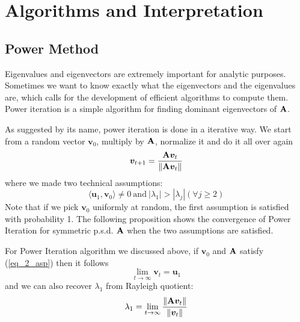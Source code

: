 \documentclass[../book-template.tex]{subfiles}
\begin{document}
\section{Algorithms and Interpretation}
\subsection{Power Method}
Eigenvalues and eigenvectors are extremely important for analytic purposes. Sometimes we want to know exactly what the eigenvectors and the eigenvalues are, which calls for the development of efficient algorithms to compute them. Power iteration is a simple algorithm for finding dominant eigenvectors of ${\bf A}$.
\par As suggested by its name, power iteration is done in a iterative way. We start from a random vector $\bm{v}_0$, multiply by ${\bf A}$, normalize it and do it all over again
\begin{equation*}
    \bm{v}_{t+1} = \frac{{\bf A}\bm{v}_t}{\|{\bf A}\bm{v}_t\|}
\end{equation*}
where we made two technical assumptions:
\begin{equation}\label{eq_2_asp}
    \langle \bm{u}_1,\bm{v}_0\rangle\neq 0\ \text{and}\ |\lambda_1|>|\lambda_j|(\forall j\geq2)
\end{equation}
Note that if we pick $\bm{v}_0$ uniformly at random, the first assumption is satisfied with probability 1. The following proposition shows the convergence of Power Iteration for symmetric p.s.d. ${\bf A}$ when the two assumptions are satisfied.
\begin{proposition}
For Power Iteration algorithm we discussed above, if $\bm{v}_0$ and ${\bf A}$ satisfy (\ref{eq_2_asp}) then it follows
\begin{equation*}
    \lim_{t\rightarrow\infty}\bm{v}_t=\bm{u}_1
\end{equation*}
and we can also recover $\lambda_1$ from Rayleigh quotient:
\begin{equation*}
    \lambda_1 = \lim_{t\rightarrow \infty} \frac{\|{\bf A}\bm{v}_t\|}{\|\bm{v}_t\|}
\end{equation*}
\end{proposition}
\end{document}

